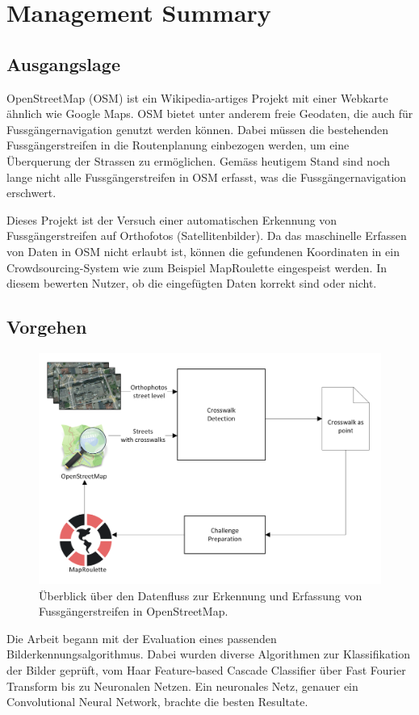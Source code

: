 \section{Management Summary}
\subsection*{Ausgangslage}
OpenStreetMap (OSM) ist ein Wikipedia-artiges Projekt mit einer Webkarte ähnlich wie Google Maps. OSM bietet unter anderem freie Geodaten, die auch für Fussgängernavigation genutzt werden können. Dabei müssen die bestehenden Fussgängerstreifen in die Routenplanung einbezogen werden, um eine Überquerung der Strassen zu ermöglichen. Gemäss heutigem Stand sind noch lange nicht alle Fussgängerstreifen in OSM erfasst, was die Fussgängernavigation erschwert.

Dieses Projekt ist der Versuch einer automatischen Erkennung von Fussgängerstreifen auf Orthofotos (Satellitenbilder). Da das maschinelle Erfassen von Daten in OSM nicht erlaubt ist, können die gefundenen Koordinaten in ein Crowdsourcing-System wie zum Beispiel MapRoulette eingespeist werden. In diesem bewerten Nutzer, ob die eingefügten Daten korrekt sind oder nicht.

\subsection*{Vorgehen}
\begin{figure}[H]
	\centering
	\includegraphics[width=410pt]{images/management_summary_1.png}
	\caption[Management Summery Überblick]{Überblick über den Datenfluss zur Erkennung und Erfassung von Fussgängerstreifen in OpenStreetMap.}
\end{figure}
Die Arbeit begann mit der Evaluation eines passenden Bilderkennungsalgorithmus. Dabei wurden diverse Algorithmen zur Klassifikation der Bilder geprüft, vom Haar Feature-based Cascade Classifier über Fast Fourier Transform bis zu Neuronalen Netzen. Ein neuronales Netz, genauer ein Convolutional Neural Network, brachte die besten Resultate.


